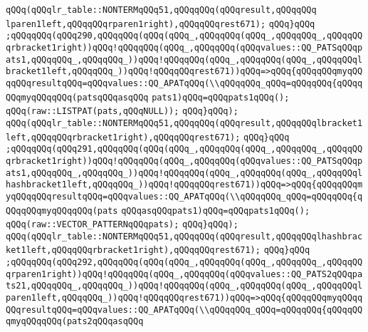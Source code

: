 \verb|qQQq(qQQqlr_table::NONTERMqQQq51,qQQqqQQq(qQQqresult,qQQqqQQq|\newline
\verb|lparen1left,qQQqqQQqrparen1right),qQQqqQQqrest671);|\newline
\verb|qQQq}qQQq|\newline
\verb|;qQQqqQQq(qQQq290,qQQqqQQq(qQQq(qQQq_,qQQqqQQq(qQQq_,qQQqqQQq_,qQQqqQQqrbracket1right))qQQq!qQQqqQQq(qQQq_,qQQqqQQq(qQQqvalues::QQ_PATSqQQqpats1,qQQqqQQq_,qQQqqQQq_))qQQq!qQQqqQQq(qQQq_,qQQqqQQq(qQQq_,qQQqqQQqlbracket1left,qQQqqQQq_))qQQq!qQQqqQQqrest671))qQQq=>qQQq{qQQqqQQqmyqQQqqQQqresultqQQq=qQQqvalues::QQ_APATqQQq(\\qQQqqQQq_qQQq=qQQqqQQq{qQQqqQQqmyqQQqqQQq(patsqQQqasqQQq|\newline
\verb|pats1)qQQq=qQQqpats1qQQq();|\newline
\verb|qQQq(raw::LISTPAT(pats,qQQqNULL));|\newline
\verb|qQQq}qQQq);|\newline
\verb|qQQq(qQQqlr_table::NONTERMqQQq51,qQQqqQQq(qQQqresult,qQQqqQQqlbracket1left,qQQqqQQqrbracket1right),qQQqqQQqrest671);|\newline
\verb|qQQq}qQQq|\newline
\verb|;qQQqqQQq(qQQq291,qQQqqQQq(qQQq(qQQq_,qQQqqQQq(qQQq_,qQQqqQQq_,qQQqqQQqrbracket1right))qQQq!qQQqqQQq(qQQq_,qQQqqQQq(qQQqvalues::QQ_PATSqQQqpats1,qQQqqQQq_,qQQqqQQq_))qQQq!qQQqqQQq(qQQq_,qQQqqQQq(qQQq_,qQQqqQQqlhashbracket1left,qQQqqQQq_))qQQq!qQQqqQQqrest671))qQQq=>qQQq{qQQqqQQqmyqQQqqQQqresultqQQq=qQQqvalues::QQ_APATqQQq(\\qQQqqQQq_qQQq=qQQqqQQq{qQQqqQQqmyqQQqqQQq(pats|\newline
\verb|qQQqasqQQqpats1)qQQq=qQQqpats1qQQq();|\newline
\verb|qQQq(raw::VECTOR_PATTERNqQQqpats);|\newline
\verb|qQQq}qQQq);|\newline
\verb|qQQq(qQQqlr_table::NONTERMqQQq51,qQQqqQQq(qQQqresult,qQQqqQQqlhashbracket1left,qQQqqQQqrbracket1right),qQQqqQQqrest671);|\newline
\verb|qQQq}qQQq|\newline
\verb|;qQQqqQQq(qQQq292,qQQqqQQq(qQQq(qQQq_,qQQqqQQq(qQQq_,qQQqqQQq_,qQQqqQQqrparen1right))qQQq!qQQqqQQq(qQQq_,qQQqqQQq(qQQqvalues::QQ_PATS2qQQqpats21,qQQqqQQq_,qQQqqQQq_))qQQq!qQQqqQQq(qQQq_,qQQqqQQq(qQQq_,qQQqqQQqlparen1left,qQQqqQQq_))qQQq!qQQqqQQqrest671))qQQq=>qQQq{qQQqqQQqmyqQQqqQQqresultqQQq=qQQqvalues::QQ_APATqQQq(\\qQQqqQQq_qQQq=qQQqqQQq{qQQqqQQqmyqQQqqQQq(pats2qQQqasqQQq|\newline
